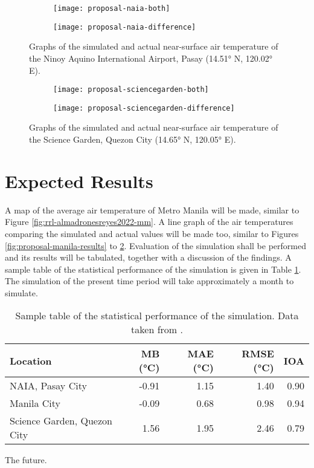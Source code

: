 	\begin{figure}
		\centering
		\begin{subfigure}{\textwidth}
			\texttt{[image: proposal-naia-both]}
		\end{subfigure}
		\begin{subfigure}{\textwidth}
			\texttt{[image: proposal-naia-difference]}
		\end{subfigure}
		\caption{
			Graphs of the simulated and actual near-surface air temperature of the Ninoy Aquino International Airport, Pasay (\ang{14.51} N, \ang{120.02} E).
		}
		\label{fig:proposal-naia-results}
	\end{figure}

	\begin{figure}
		\centering
		\begin{subfigure}{\textwidth}
			\texttt{[image: proposal-sciencegarden-both]}
		\end{subfigure}
		\begin{subfigure}{\textwidth}
			\texttt{[image: proposal-sciencegarden-difference]}
		\end{subfigure}
		\caption{
			Graphs of the simulated and actual near-surface air temperature of the Science Garden, Quezon City (\ang{14.65} N, \ang{120.05} E).
		}
		\label{fig:proposal-sciencegarden-results}
	\end{figure}

\section{Expected Results}
	A map of the average air temperature of Metro Manila will be made, similar to Figure \ref{fig:rrl-almadronesreyes2022-mm}.
	A line graph of the air temperatures comparing the simulated and actual values will be made too, similar to Figures \ref{fig:proposal-manila-results} to \ref{fig:proposal-sciencegarden-results}.
	Evaluation of the simulation shall be performed and its results will be tabulated, together with a discussion of the findings.
	A sample table of the statistical performance of the simulation is given in Table \ref{tab:sample-statistical-performance}.
	The simulation of the present time period will take approximately a month to simulate.

	\begin{table}[]
		\caption{
			Sample table of the statistical performance of the simulation.
			Data taken from \textcite{Bilang2022}.
		}
		\label{tab:sample-statistical-performance}
		\centering
		\begin{tabular}{lrrrr}
			\hline \hline
			Location                    & MB (\unit{\degreeCelsius})    & MAE (\unit{\degreeCelsius}) & RMSE (\unit{\degreeCelsius}) & IOA \\
			\hline
			NAIA, Pasay City            & -0.91 & 1.15 & 1.40 & 0.90 \\
			Manila City                 & -0.09 & 0.68 & 0.98 & 0.94 \\
			Science Garden, Quezon City & 1.56  & 1.95 & 2.46 & 0.79 \\
			\hline
		\end{tabular}
	\end{table}

	The future.